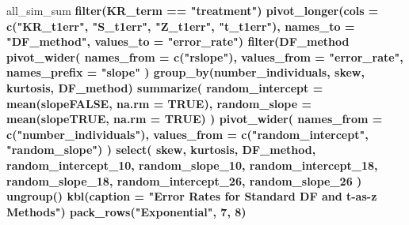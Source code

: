 \documentclass[12pt, twoside]{amherstthesis}
\newenvironment{Shaded}{\begin{snugshade}}{\end{snugshade}}
\newcommand{\DataTypeTok}[1]{\textcolor[rgb]{0.13,0.29,0.53}{#1}}
\newcommand{\DecValTok}[1]{\textcolor[rgb]{0.00,0.00,0.81}{#1}}
\newcommand{\KeywordTok}[1]{\textcolor[rgb]{0.13,0.29,0.53}{\textbf{#1}}}
\newcommand{\NormalTok}[1]{#1}
\newcommand{\OperatorTok}[1]{\textcolor[rgb]{0.81,0.36,0.00}{\textbf{#1}}}
\newcommand{\OtherTok}[1]{\textcolor[rgb]{0.56,0.35,0.01}{#1}}
\newcommand{\StringTok}[1]{\textcolor[rgb]{0.31,0.60,0.02}{#1}}
\begin{document}
\begin{Shaded}
\begin{Highlighting}[]
{{{{{{{{{{{{{{{{{{{{{{{{{{{{{{{{{{{{{{{{{{{{{{{{{{{{{{{{{{{{{{{{{{{{{{{\NormalTok{all_sim_sum }\OperatorTok{%>%}
\StringTok{  }\KeywordTok{filter}\NormalTok{(KR_term }\OperatorTok{==}\StringTok{ "treatment"}\NormalTok{) }\OperatorTok{%>%}
\StringTok{  }\KeywordTok{pivot_longer}\NormalTok{(}\DataTypeTok{cols =} \KeywordTok{c}\NormalTok{(}\StringTok{"KR_t1err"}\NormalTok{, }\StringTok{"S_t1err"}\NormalTok{, }\StringTok{"Z_t1err"}\NormalTok{, }\StringTok{"t_t1err"}\NormalTok{), }
               \DataTypeTok{names_to =} \StringTok{"DF_method"}\NormalTok{, }\DataTypeTok{values_to =} \StringTok{"error_rate"}\NormalTok{) }\OperatorTok{%>%}
\StringTok{  }\KeywordTok{filter}\NormalTok{(DF_method }\OperatorTok{%in%}\StringTok{ }\KeywordTok{c}\NormalTok{(}\StringTok{"Z_t1err"}\NormalTok{, }\StringTok{"t_t1err"}\NormalTok{)) }\OperatorTok{%>%}
\StringTok{  }\KeywordTok{pivot_wider}\NormalTok{(}
    \DataTypeTok{names_from =} \KeywordTok{c}\NormalTok{(}\StringTok{"rslope"}\NormalTok{),}
    \DataTypeTok{values_from =} \StringTok{"error_rate"}\NormalTok{, }\DataTypeTok{names_prefix =} \StringTok{"slope"}
\NormalTok{  ) }\OperatorTok{%>%}
\StringTok{  }\KeywordTok{group_by}\NormalTok{(number_individuals, skew, kurtosis, DF_method) }\OperatorTok{%>%}
\StringTok{  }\KeywordTok{summarize}\NormalTok{(}
    \DataTypeTok{random_intercept =} \KeywordTok{mean}\NormalTok{(slopeFALSE, }\DataTypeTok{na.rm =} \OtherTok{TRUE}\NormalTok{),}
    \DataTypeTok{random_slope =} \KeywordTok{mean}\NormalTok{(slopeTRUE, }\DataTypeTok{na.rm =} \OtherTok{TRUE}\NormalTok{)}
\NormalTok{  ) }\OperatorTok{%>%}
\StringTok{  }\KeywordTok{pivot_wider}\NormalTok{(}
    \DataTypeTok{names_from =} \KeywordTok{c}\NormalTok{(}\StringTok{"number_individuals"}\NormalTok{),}
    \DataTypeTok{values_from =} \KeywordTok{c}\NormalTok{(}\StringTok{"random_intercept"}\NormalTok{, }\StringTok{"random_slope"}\NormalTok{)}
\NormalTok{  ) }\OperatorTok{%>%}
\StringTok{  }\KeywordTok{select}\NormalTok{(}
\NormalTok{    skew, kurtosis, DF_method, random_intercept_}\DecValTok{10}\NormalTok{, random_slope_}\DecValTok{10}\NormalTok{, }
\NormalTok{    random_intercept_}\DecValTok{18}\NormalTok{,}
\NormalTok{    random_slope_}\DecValTok{18}\NormalTok{, random_intercept_}\DecValTok{26}\NormalTok{, random_slope_}\DecValTok{26}
\NormalTok{  ) }\OperatorTok{%>%}
\StringTok{  }\KeywordTok{ungroup}\NormalTok{() }\OperatorTok{%>%}
\StringTok{  }\KeywordTok{kbl}\NormalTok{(}\DataTypeTok{caption =} \StringTok{"Error Rates for Standard DF and t-as-z Methods"}\NormalTok{) }\OperatorTok{%>%}
\StringTok{  }\KeywordTok{pack_rows}\NormalTok{(}\StringTok{"Exponential"}\NormalTok{, }\DecValTok{7}\NormalTok{, }\DecValTok{8}\NormalTok{) }\OperatorTok{%>%}
}}}}}}}}}}}}}}}}}}}}}}}}}}}}}}}}}}}}}}}}}}}}}}}}}}}}}}}}}}}}}}}}}}}}}}}}}}}}}}}}}}}
\end{Highlighting}
\end{Shaded}
\end{document}
